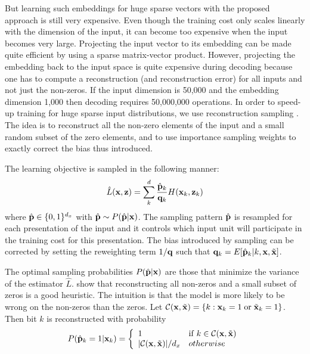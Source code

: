 But learning such embeddings for huge sparse vectors with the proposed approach
is still very expensive. Even though the training cost only scales linearly
with the dimension of the input, it can become too expensive when the input
becomes very large. Projecting the input vector to its embedding can be made
quite efficient by using a sparse matrix-vector product. However, projecting
the embedding back to the input space is quite expensive during decoding because
one has to compute a reconstruction (and reconstruction error)
for all inputs and not just the non-zeros. If
the input dimension is 50,000 and the embedding dimension 1,000 then decoding
requires 50,000,000 operations. In order to speed-up training for huge sparse
input distributions, we use reconstruction sampling \citep{Dauphin+al-2011}. The
idea is to reconstruct all the non-zero elements of the input and a small
random subset of the zero elements, and to use importance sampling weights
to exactly correct the bias thus introduced.

The learning objective is sampled in the following manner: \[ \hat{L}({\bf x},
{\bf z}) = \sum_k^d \frac{\hat{\bf p}_k}{{\bf q}_k} H({\bf x}_k, {\bf z}_k) \]
where $\hat{\bf p} \in \{0, 1\}^{d_x}$ with $\hat{\bf p} \sim P(\hat{\bf
p}|{\bf x})$. The sampling pattern $\hat{\bf p}$ is resampled for each
presentation of the input and it controls which input unit will participate in
the training cost for this presentation. The bias introduced by sampling can be
corrected by setting the reweighting term $1/{\bf q}$ such that ${\bf
q}_k=E[\hat{\bf p}_k|k,{\bf x},\tilde{\bf x}]$.

The optimal sampling probabilities $P(\hat{\bf p}|{\bf x})$ are those that
minimize the variance of the estimator $\hat{L}$. \cite{Dauphin+al-2011} show that
reconstructing all non-zeros and a small subset of zeros is a good heuristic.
The intuition is that the model is more likely to be wrong on the non-zeros
than the zeros. Let ${\cal C}({\bf x},\tilde{\bf x})=\{k: {\bf x}_k=1 \;{\rm
or}\;\tilde{\bf x}_k=1\}$. Then bit $k$ is reconstructed with probability
\begin{equation} \label{eq:p} P(\hat{\bf p}_k=1|{\bf x}_k) = \left\{
    \begin{array}{ll} 1 & {\rm if}\; k \in {\cal C}({\bf x},\tilde{\bf x}) \\
    |{\cal C}({\bf x},\tilde{\bf x})|/d_x & otherwise \end{array} \right.
\end{equation}

